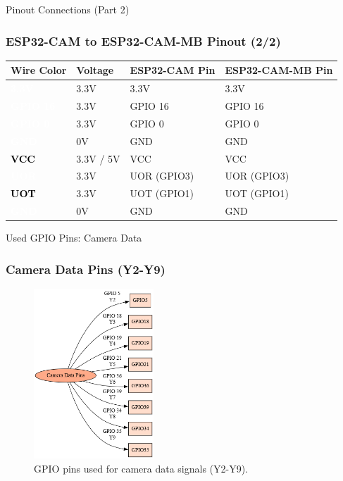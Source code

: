 \documentclass{beamer}
\begin{document}
\begin{frame}{Pinout Connections (Part 2)}
  \frametitle{ESP32-CAM to ESP32-CAM-MB Pinout (2/2)}
  \renewcommand{\arraystretch}{1.4} %
  \begin{tabularx}{\textwidth}{|>{\centering\arraybackslash}p{4cm}|>{\centering\arraybackslash}X|>{\centering\arraybackslash}X|>{\centering\arraybackslash}X|}
    \hline
    \textbf{Wire Color} & \textbf{Voltage} & \textbf{ESP32-CAM Pin} & \textbf{ESP32-CAM-MB Pin} \\
    \hline
    \colorbox{clrPin9}{\textcolor{white}{\bfseries 3.3V}} & 3.3V & 3.3V & 3.3V \\
    \hline
    \colorbox{clrPin10}{\textcolor{white}{\bfseries GPIO 16}} & 3.3V & GPIO 16 & GPIO 16 \\
    \hline
    \colorbox{clrPin11}{\textcolor{white}{\bfseries GPIO 0}} & 3.3V & GPIO 0 & GPIO 0 \\
    \hline
    \colorbox{clrPin12}{\textcolor{white}{\bfseries GND}} & 0V & GND & GND \\
    \hline
    \colorbox{clrPin13}{\textcolor{black}{\bfseries VCC}} & 3.3V / 5V & VCC & VCC \\
    \hline
    \colorbox{clrPin14}{\textcolor{white}{\bfseries UOR}} & 3.3V & UOR (GPIO3) & UOR (GPIO3) \\
    \hline
    \colorbox{clrPin15}{\textcolor{black}{\bfseries UOT}} & 3.3V & UOT (GPIO1) & UOT (GPIO1) \\
    \hline
    \colorbox{clrPin16}{\textcolor{white}{\bfseries GND}} & 0V & GND & GND \\
    \hline

  \end{tabularx}
\end{frame}
\begin{frame}{Used GPIO Pins: Camera Data}
  \frametitle{Camera Data Pins (Y2-Y9)}
  \begin{figure}
    \centering
    \includegraphics[width=0.40\textwidth]{camera_data_pins.png}
    \caption{GPIO pins used for camera data signals (Y2-Y9).}
  \end{figure}
\end{frame}
\end{document}
